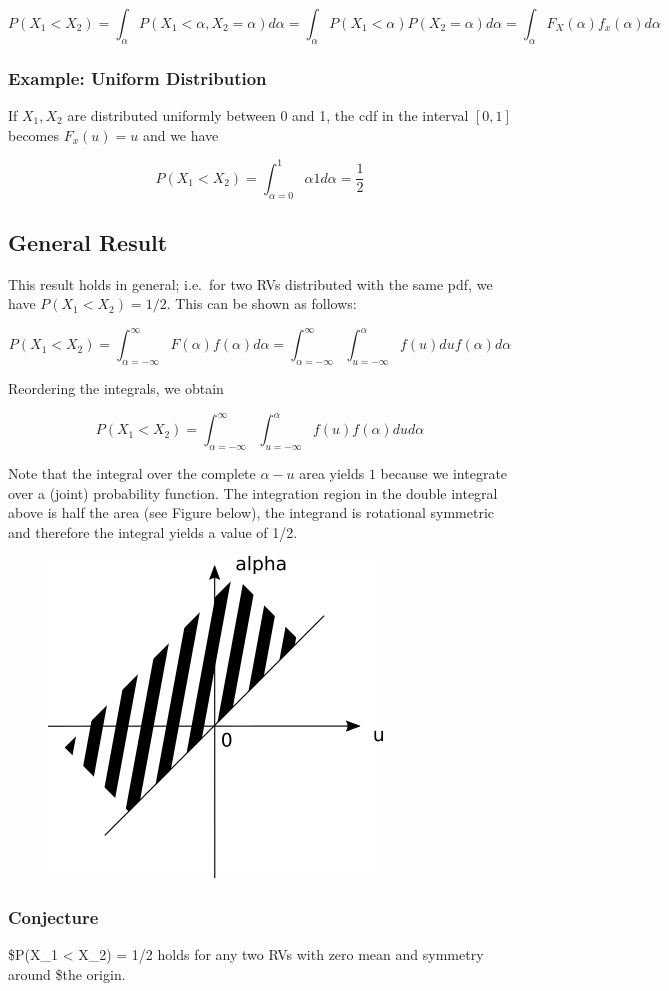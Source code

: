 \[
P(X_1 < X_2) = \int_\alpha P(X_1<\alpha, X_2=\alpha) d\alpha = \int_\alpha P(X_1<\alpha) P(X_2=\alpha) d\alpha = \int_\alpha F_X(\alpha) f_x(\alpha) d\alpha
\]

\subsubsection{Example: Uniform Distribution}

If \(X_1, X_2\) are distributed uniformly between 0 and 1, the cdf in
the interval \([0,1]\) becomes \(F_x(u) = u\) and we have

\[
P(X_1 < X_2) = \int_{\alpha=0}^1 \alpha 1 d\alpha = \frac{1}{2}
\]

\subsection{General Result}

This result holds in general; i.e.~for two RVs distributed with the same
pdf, we have \(P(X_1 < X_2) = 1/2\). This can be shown as follows:

\[
P(X_1 < X_2) = \int_{\alpha=-\infty}^\infty F(\alpha) f(\alpha) d\alpha = \int_{\alpha=-\infty}^\infty \int_{u=-\infty}^\alpha f(u) du f(\alpha) d\alpha
\]

Reordering the integrals, we obtain

\[
P(X_1 < X_2) = \int_{\alpha=-\infty}^\infty \int_{u=-\infty}^\alpha f(u) f(\alpha) du d\alpha
\]

Note that the integral over the complete \(\alpha - u\) area yields
\(1\) because we integrate over a (joint) probability function. The
integration region in the double integral above is half the area (see
Figure below), the integrand is rotational symmetric and therefore the
integral yields a value of 1/2.

\begin{figure}[H]
\includegraphics{images/rv_relation_2.png}
\end{figure}

\subsubsection{Conjecture}

\$P(X\_1 \textless{} X\_2) = 1/2 holds for any two RVs with zero mean
and symmetry around \$the origin.
